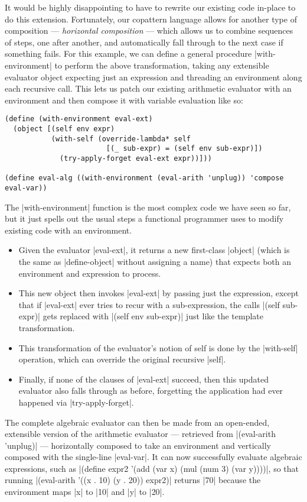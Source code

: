 It would be highly disappointing to have to rewrite our existing code in-place to do this extension.
Fortunately, our copattern language allows for another type of composition --- \emph{horizontal composition} --- which allows us to combine sequences of steps, one after another, and automatically fall through to the next case if something fails.
For this example, we can define a general procedure \scm|with-environment| to perform the above transformation, taking any extensible evaluator object expecting just an expression and threading an environment along each recursive call.
This lets us patch our existing arithmetic evaluator with an environment and then compose it with variable evaluation like so:
\begin{verbatim}
(define (with-environment eval-ext)
  (object [(self env expr)
           (with-self (override-lambda* self
                        [(_ sub-expr) = (self env sub-expr)])
             (try-apply-forget eval-ext expr))]))

(define eval-alg ((with-environment (eval-arith 'unplug)) 'compose eval-var))
\end{verbatim}
The \scm|with-environment| function is the most complex code we have seen so far, but it just spells out the usual steps a functional programmer uses to modify existing code with an environment.
\begin{itemize}
\item Given the evaluator \scm|eval-ext|, it returns a new first-class \scm|object| (which is the same as \scm|define-object| without assigning a name) that expects both an environment and expression to process.
\item This new object then invokes \scm|eval-ext| by passing just the expression, except that if \scm|eval-ext| ever tries to recur with a sub-expression, the calls \scm|(self sub-expr)| gets replaced with \scm|(self env sub-expr)| just like the template transformation.
\item This transformation of the evaluator's notion of self is done by the \scm|with-self| operation, which can override the original recursive \scm|self|.
\item Finally, if none of the clauses of \scm|eval-ext| succeed, then this updated evaluator also falls through as before, forgetting the application had ever happened via \scm|try-apply-forget|.
\end{itemize}
The complete algebraic evaluator can then be made from an open-ended, extensible version of the arithmetic evaluator --- retrieved from \scm|(eval-arith 'unplug)| --- horizontally composed to take an environment and vertically composed with the single-line \scm|eval-var|.
It can now successfully evaluate algebraic expressions, such as \scm|(define expr2 '(add (var x) (mul (num 3) (var y))))|, so that running \scm|(eval-arith '((x . 10) (y . 20)) expr2)| returns \scm|70| because the environment maps \scm|x| to \scm|10| and \scm|y| to \scm|20|.

